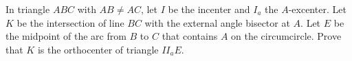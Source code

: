 In triangle $ABC$ with $AB\ne AC$, let $I$ be the incenter and $I_a$ the $A$-excenter. Let $K$ be the intersection of line $BC$ with the external angle bisector at $A$. Let $E$ be the midpoint of the arc from $B$ to $C$ that contains $A$ on the circumcircle. Prove that $K$ is the orthocenter of triangle $II_aE$.
